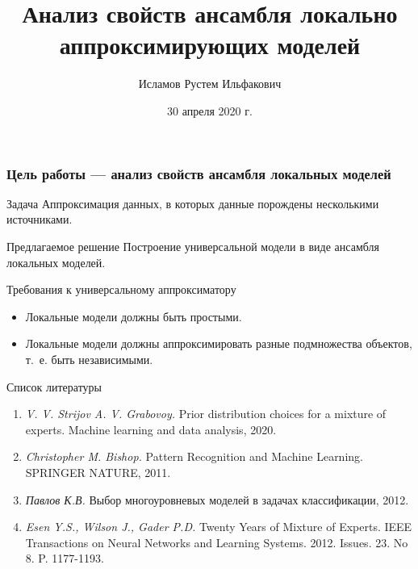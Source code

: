 \documentclass[9pt,pdf,hyperref={unicode}]{beamer}
\title[Ансамбль локальных моделей]
{Анализ свойств ансамбля локально
аппроксимирующих моделей}
\author[Исламов Р.\ И.]{\Large Исламов Рустем Ильфакович}
\institute[]{\large Московский физико-технический институт\\
~\\

Консультант: Грабовой А.\ В.\\
Эксперт:   Стрижов В.\ В.
}
\date{30 апреля 2020 г.}
\begin{document}
\begin{frame}
\titlepage
\end{frame}



\begin{frame}
\frametitle{Цель работы --- анализ свойств ансамбля локальных моделей} 


\begin{block}{Задача}
Аппроксимация данных, в которых данные порождены несколькими источниками.
\end{block}


\begin{block}{Предлагаемое решение}
Построение универсальной модели в виде ансамбля локальных
моделей.
\end{block}

\begin{block}{Требования к универсальному аппроксиматору}
\begin{itemize}
    \item Локальные модели должны быть простыми.
    \item Локальные модели должны аппроксимировать разные подмножества объектов, т.~е. быть независимыми.
    
\end{itemize}
\end{block}

\end{frame}

\begin{frame}{Список литературы}
	\begin{enumerate}
	\justifying
		\item \textit{V. V. Strijov A. V. Grabovoy.} Prior distribution choices for a mixture of experts. Machine learning and data analysis, 2020.
		

		\item \textit{Christopher M. Bishop.} Pattern Recognition and Machine Learning. SPRINGER NATURE, 2011.
 
		
		\item \textit{Павлов К.В.}  Выбор многоуровневых моделей в задачах классификации, 2012.
		
		\item \textit{Esen Y.S., Wilson J., Gader P.D.}  Twenty Years of Mixture of Experts. IEEE Transactions on Neural Networks and Learning Systems. 2012. Issues. 23. No 8. P. 1177-1193.
		
	\end{enumerate}
\end{frame}
\end{document}
